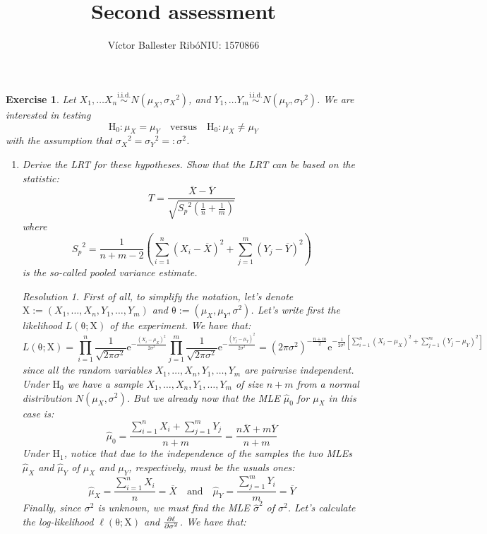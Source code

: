 \documentclass[10pt,a4paper]{article}
\title{\bfseries\Large Second assessment}
\author{Víctor Ballester Ribó\endgraf NIU: 1570866}
\date{\parbox{\linewidth}{\centering
  Statistics\endgraf
  Degree in Mathematics\endgraf
  Universitat Autònoma de Barcelona\endgraf
  May 2022}}
\newcommand{\vf}[1]{\boldsymbol{\mathrm{#1}}} %
\theoremstyle{plain}
\newtheorem{exercice}{Exercise}
\theoremstyle{remark}
\newtheorem*{resolution}{Resolution}
\renewcommand{\exp}[1]{\mathrm{e}^{#1}} %
\begin{document}
\maketitle
\setcounter{exercice}{9}
\begin{exercice}
  Let $X_1,\ldots X_n\overset{\text{i.i.d.}}{\sim}N(\mu_X,{\sigma_X}^2)$, and $Y_1,\ldots Y_m\overset{\text{i.i.d.}}{\sim}N(\mu_Y,{\sigma_Y}^2)$. We are interested in testing $$\text{H}_0:\mu_X=\mu_Y\quad\text{versus}\quad\text{H}_0:\mu_X\ne\mu_Y$$ with the assumption that ${\sigma_X}^2={\sigma_Y}^2=:\sigma^2$.
  \begin{enumerate}
    \item Derive the LRT for these hypotheses. Show that the LRT can be based on the
          statistic:
          \begin{equation}
            T=\frac{\overline{X}-\overline{Y}}{\sqrt{{S_p}^2\left(\frac{1}{n}+\frac{1}{m}\right)}}
          \end{equation}
          where $${S_p}^2=\frac{1}{n+m-2}\left(\sum_{i=1}^n{(X_i-\overline{X})}^2+\sum_{j=1}^m{(Y_j-\overline{Y})}^2\right)$$ is the so-called pooled variance estimate.
          \begin{resolution}
            First of all, to simplify the notation, let's denote $\vf{X}:=(X_1,\ldots,X_n,Y_1,\ldots,Y_m)$ and $\vf\theta:=(\mu_X,\mu_Y,\sigma^2)$. Let's write first the likelihood $L(\vf\theta;\vf{X})$ of the experiment. We have that:
            $$L(\vf\theta;\vf{X})=\prod_{i=1}^n\frac{1}{\sqrt{2\pi\sigma^2}}\exp{-\frac{{(X_i-\mu_X)}^2}{2\sigma^2}}\prod_{j=1}^m\frac{1}{\sqrt{2\pi\sigma^2}}\exp{-\frac{{(Y_j-\mu_Y)}^2}{2\sigma^2}}={(2\pi\sigma^2)}^{-\frac{n+m}{2}}\exp{-\frac{1}{2\sigma^2}\left[\sum_{i=1}^n{(X_i-\mu_X)}^2+\sum_{j=1}^m{(Y_j-\mu_Y)}^2\right]}$$
            since all the random variables $X_1,\ldots,X_n,Y_1,\ldots,Y_m$ are pairwise independent. Under $\text{H}_0$ we have a sample $X_1,\ldots,X_n,Y_1,\ldots,Y_m$ of size $n+m$ from a normal distribution $N(\mu_X,{\sigma}^2)$. But we already now that the MLE $\hat\mu_0$ for $\mu_X$ in this case is: $$\hat\mu_0=\frac{\sum_{i=1}^nX_i+\sum_{j=1}^mY_j}{n+m}=\frac{n\overline{X}+m\overline{Y}}{n+m}$$
            Under $\text{H}_1$, notice that due to the independence of the samples the two MLEs $\hat\mu_X$ and $\hat\mu_Y$ of $\mu_X$ and $\mu_Y$, respectively, must be the usuals ones: $$\hat\mu_X=\frac{\sum_{i=1}^nX_i}{n}=\overline{X}\quad\text{and}\quad\hat\mu_Y=\frac{\sum_{j=1}^mY_i}{m}=\overline{Y}$$
            Finally, since $\sigma^2$ is unknown, we must find the MLE ${\hat\sigma}^2$ of $\sigma^2$. Let's calculate the log-likelihood $\ell(\vf\theta;\vf{X})$ and $\pdv{\ell}{\sigma^2}(\vf\theta;\vf{X})$. We have that:

\end{resolution}
\end{enumerate}
\end{exercice}
\end{document}
